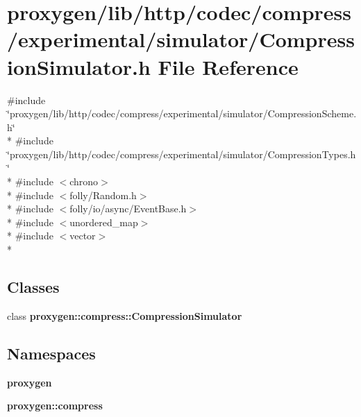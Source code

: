 \section{proxygen/lib/http/codec/compress/experimental/simulator/\+Compression\+Simulator.h File Reference}
\label{CompressionSimulator_8h}
{\ttfamily \#include \char`\"{}proxygen/lib/http/codec/compress/experimental/simulator/\+Compression\+Scheme.\+h\char`\"{}}\\*
{\ttfamily \#include \char`\"{}proxygen/lib/http/codec/compress/experimental/simulator/\+Compression\+Types.\+h\char`\"{}}\\*
{\ttfamily \#include $<$chrono$>$}\\*
{\ttfamily \#include $<$folly/\+Random.\+h$>$}\\*
{\ttfamily \#include $<$folly/io/async/\+Event\+Base.\+h$>$}\\*
{\ttfamily \#include $<$unordered\+\_\+map$>$}\\*
{\ttfamily \#include $<$vector$>$}\\*
\subsection*{Classes}
\begin{DoxyCompactItemize}
\item 
class {\bf proxygen\+::compress\+::\+Compression\+Simulator}
\end{DoxyCompactItemize}
\subsection*{Namespaces}
\begin{DoxyCompactItemize}
\item 
 {\bf proxygen}
\item 
 {\bf proxygen\+::compress}
\end{DoxyCompactItemize}
